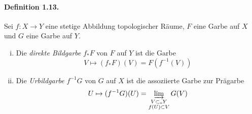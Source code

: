 \paragraph{Definition 1.13.}\label{1.13} Sei $f:X\to Y$ eine stetige Abbildung topologischer Räume, $F$ eine Garbe auf $X$ und $G$ eine Garbe auf $Y$.
\begin{enumerate}[(i)]
\item Die \textit{direkte Bildgarbe} $f_\ast F$ von $F$ auf $Y$ ist die Garbe
\[V\mapsto (f_\ast F)(V)=F(f^{-1}(V)) \]
\item Die \textit{Urbildgarbe} $f^{-1}G$ von $G$ auf $X$ ist die assoziierte Garbe zur Prägarbe
\[U\mapsto (f^{-1}G)(U)= \varinjlim_{\substack{V\subset_\text{o}Y\\ f(U)\subset V}}G(V) \]
\end{enumerate}

